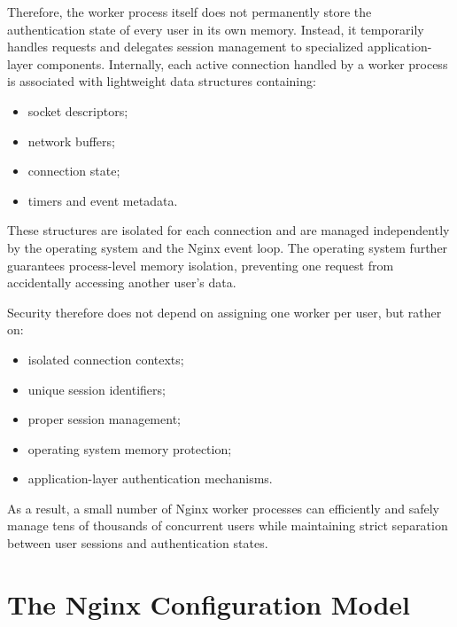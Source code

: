 \documentclass{scrbook}
\begin{document}
	Therefore, the worker process itself does not permanently store the authentication state of every user in its own memory. Instead, it temporarily handles requests and delegates session management to specialized application-layer components. Internally, each active connection handled by a worker process is associated with lightweight data structures containing:
	\begin{itemize}
		\item socket descriptors;
		\item network buffers;
		\item connection state;
		\item timers and event metadata.
	\end{itemize}
	
	These structures are isolated for each connection and are managed independently by the operating system and the Nginx event loop. The operating system further guarantees process-level memory isolation, preventing one request from accidentally accessing another user's data.\newpage
	
	Security therefore does not depend on assigning one worker per user, but rather on:
	\begin{itemize}
		\item isolated connection contexts;
		\item unique session identifiers;
		\item proper session management;
		\item operating system memory protection;
		\item application-layer authentication mechanisms.
	\end{itemize}
	
	As a result, a small number of Nginx worker processes can efficiently and safely manage tens of thousands of concurrent users while maintaining strict separation between user sessions and authentication states.
	
	\section{The Nginx Configuration Model}
	
\end{document}
